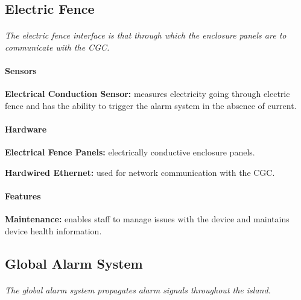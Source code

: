 \documentclass[12pt]{article}
\begin{document}
	\subsection{Electric Fence}
	\paragraph{} \textit{The electric fence interface is that through which the enclosure
	panels are to communicate with the CGC.}
	
	\paragraph{Sensors}
	\begin{list}{}{}
		\item \textbf{Electrical Conduction Sensor:} measures electricity going through 
		electric fence and has the ability to trigger the alarm system in the absence of 
		current. 
	\end{list}
		
	\paragraph{Hardware}
	\begin{list}{}{}
		\item \textbf{Electrical Fence Panels:} electrically conductive enclosure panels.
		\item \textbf{Hardwired Ethernet:} used for network communication with the CGC. 
	\end{list}
	
	\paragraph{Features}
	\begin{list}{}{}
		\item \textbf{Maintenance:} enables staff to manage issues with the device	and 
		maintains device health information.
	\end{list}

	\subsection{Global Alarm System}
	\paragraph{} \textit{The global alarm system propagates alarm signals throughout the island.}
\end{document}
